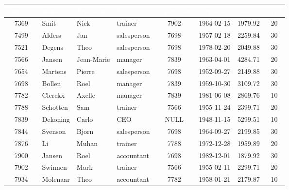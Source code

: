 \documentclass[10pt,a4paper]{article}
\newcommand{\TBLH}[1]{\textbf{\textcolor{white}{#1}}}
\begin{document}
{\scriptsize
\begin{tabular}{|c|l|l|l|c|l|r|c|}
\hline
\rowcolor{tblhead}\TBLH{emp\_nr} & \TBLH{name} & \TBLH{firstname} & \TBLH{func} & \TBLH{supervisor} & \TBLH{birthdate} & \TBLH{salary} & \TBLH{dept} \\ \hline
7369 & Smit     & Nick       & trainer     & 7902 & 1964-02-15 & 1979.92 & 20 \\ \hline
\rowcolor{rowalt}
7499 & Alders   & Jan        & salesperson & 7698 & 1957-02-18 & 2259.84 & 30 \\ \hline
7521 & Degens   & Theo       & salesperson & 7698 & 1978-02-20 & 2049.88 & 30 \\ \hline
\rowcolor{rowalt}
7566 & Jansen   & Jean-Marie & manager     & 7839 & 1963-04-01 & 4284.71 & 20 \\ \hline
7654 & Martens  & Pierre     & salesperson & 7698 & 1952-09-27 & 2149.88 & 30 \\ \hline
\rowcolor{rowalt}
7698 & Bollen   & Roel       & manager     & 7839 & 1959-10-30 & 3109.72 & 30 \\ \hline
7782 & Clerckx  & Axelle     & manager     & 7839 & 1981-06-08 & 2869.76 & 10 \\ \hline
\rowcolor{rowalt}
7788 & Schotten & Sam        & trainer     & 7566 & 1955-11-24 & 2399.71 & 20 \\ \hline
7839 & Dekoning & Carlo      & CEO         & NULL & 1948-11-15 & 5299.51 & 10 \\ \hline
\rowcolor{rowalt}
7844 & Svenson  & Bjorn      & salesperson & 7698 & 1964-09-27 & 2199.85 & 30 \\ \hline
7876 & Li       & Muhan      & trainer     & 7788 & 1972-12-28 & 1959.89 & 20 \\ \hline
\rowcolor{rowalt}
7900 & Jansen   & Roel       & accountant  & 7698 & 1982-12-01 & 1879.92 & 30 \\ \hline
7902 & Swinnen  & Mark       & trainer     & 7566 & 1955-02-11 & 2299.71 & 20 \\ \hline
\rowcolor{rowalt}
7934 & Molenaar & Theo       & accountant  & 7782 & 1958-01-21 & 2179.87 & 10 \\ \hline
\end{tabular}}
\end{document}
